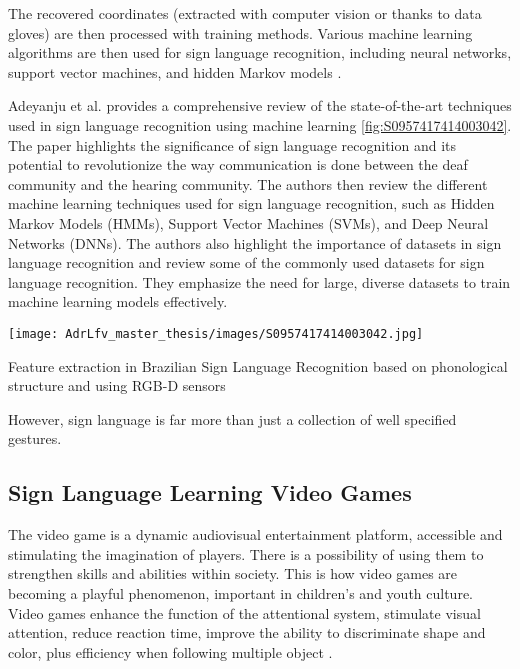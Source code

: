 The recovered coordinates (extracted with computer vision or thanks to data gloves) are then processed with training methods. Various machine learning algorithms are then used for sign language recognition, including neural networks, support vector machines, and hidden Markov models \cite{9178440}.

Adeyanju et al. provides a comprehensive review of the state-of-the-art techniques used in sign language recognition using machine learning \cite{almeida2014feature} \ref{fig:S0957417414003042}. The paper highlights the significance of sign language recognition and its potential to revolutionize the way communication is done between the deaf community and the hearing community. The authors then review the different machine learning techniques used for sign language recognition, such as Hidden Markov Models (HMMs), Support Vector Machines (SVMs), and Deep Neural Networks (DNNs).
The authors also highlight the importance of datasets in sign language recognition and review some of the commonly used datasets for sign language recognition. They emphasize the need for large, diverse datasets to train machine learning models effectively.

\begin{marginfigure}
    \centering
    \texttt{[image: AdrLfv\_master\_thesis/images/S0957417414003042.jpg]}
    \caption{Feature extraction in Brazilian Sign Language Recognition based on phonological structure and using RGB-D sensors}
    \label{fig:S0957417414003042}
\end{marginfigure}

However, sign language is far more than just a collection of well specified gestures.


\subsection{Sign Language Learning Video Games}

The video game is a dynamic audiovisual entertainment platform, accessible and stimulating the imagination of players. There is a possibility of using them to strengthen skills and abilities within society. This is how video games are becoming a playful phenomenon, important in children's and youth culture.
Video games enhance the function of the attentional system, stimulate visual attention, reduce reaction time, improve the ability to discriminate shape and color, plus efficiency when following multiple object \cite{green2006enumeration}.

